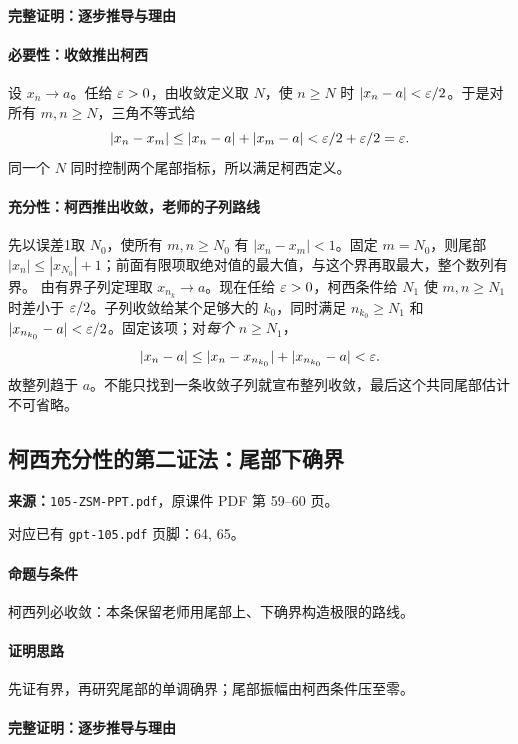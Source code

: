 \paragraph{完整证明：逐步推导与理由}

\paragraph{必要性：收敛推出柯西}设 $x_n\to a$。任给 $\varepsilon>0$，由收敛定义取 $N$，使 $n\ge N$ 时 $|x_n-a|<\varepsilon/2$。于是对所有 $m,n\ge N$，三角不等式给
\[|x_n-x_m|\le|x_n-a|+|x_m-a|<\varepsilon/2+\varepsilon/2=\varepsilon.\]
同一个 $N$ 同时控制两个尾部指标，所以满足柯西定义。
\paragraph{充分性：柯西推出收敛，老师的子列路线}
先以误差1取 $N_0$，使所有 $m,n\ge N_0$ 有 $|x_n-x_m|<1$。固定 $m=N_0$，则尾部 $|x_n|\le|x_{N_0}|+1$；前面有限项取绝对值的最大值，与这个界再取最大，整个数列有界。
由有界子列定理取 $x_{n_k}\to a$。现在任给 $\varepsilon>0$，柯西条件给 $N_1$ 使 $m,n\ge N_1$ 时差小于 $\varepsilon/2$。子列收敛给某个足够大的 $k_0$，同时满足 $n_{k_0}\ge N_1$ 和 $|x_{n_{k_0}}-a|<\varepsilon/2$。固定该项；对\emph{每个} $n\ge N_1$，
\[|x_n-a|\le|x_n-x_{n_{k_0}}|+|x_{n_{k_0}}-a|<\varepsilon.\]
故整列趋于 $a$。不能只找到一条收敛子列就宣布整列收敛，最后这个共同尾部估计不可省略。

\clearpage\subsection{柯西充分性的第二证法：尾部下确界}
\textbf{来源：}\texttt{105-ZSM-PPT.pdf}，原课件 PDF 第 59--60 页。\par
对应已有 \texttt{gpt-105.pdf} 页脚：64, 65。\par
\paragraph{命题与条件}柯西列必收敛：本条保留老师用尾部上、下确界构造极限的路线。
\paragraph{证明思路}先证有界，再研究尾部的单调确界；尾部振幅由柯西条件压至零。
\paragraph{完整证明：逐步推导与理由}

